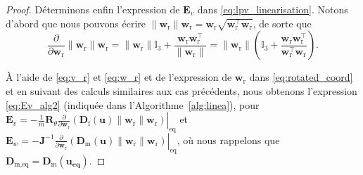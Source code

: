 \begin{proof}
Déterminons enfin l'expression de $\boldsymbol{E}_{v}$ dans \eqref{eq:lpv_linearisation}. Notons d'abord que nous pouvons écrire
$\|\boldsymbol{w}_\text{r}\| \boldsymbol{w}_\text{r} = 
 \boldsymbol{w}_\text{r} \sqrt{\boldsymbol{w}_\text{r}^\top \boldsymbol{w}_\text{r}  }$, de sorte que
$$
\frac{\partial }{\partial \boldsymbol{w}_\text{r}}
\|\boldsymbol{w}_\text{r}\| \boldsymbol{w}_\text{r} = 
\|\boldsymbol{w}_\text{r}\| \mathbb{I}_3
+ \frac{\boldsymbol{w}_\text{r} \boldsymbol{w}_\text{r}^\top}{\|\boldsymbol{w}_\text{r}\|} = 
\|\boldsymbol{w}_\text{r}\|
\left( \mathbb{I}_3 + \frac{\boldsymbol{w}_\text{r} \boldsymbol{w}_\text{r}^\top}{\boldsymbol{w}_\text{r}^\top \boldsymbol{w}_\text{r}} \right).
$$

À l'aide de \eqref{eq:v_r} et \eqref{eq:w_r} et de l'expression de $\boldsymbol{w}_\text{r}$ dans \eqref{eq:rotated_coord} et en suivant des calculs similaires aux cas précédents, nous obtenons l'expression
\eqref{eq:Ev_alg2} (indiquée dans l'Algorithme~\ref{alg:linea}), pour $\boldsymbol{E}_{v} = -  \frac{1}{m} \boldsymbol{R}_\theta \left. \frac{\partial}{\partial \boldsymbol{w}_\text{r}} \left(  \! \boldsymbol{D}_{\text{f}}(\boldsymbol{u}) \lVert \boldsymbol{w}_{\text{r}} \rVert \boldsymbol{w}_{\text{r}}  \right)\right|_{\mathrm{eq}} $ et  
 $\boldsymbol{E}_{w} = - \boldsymbol{J}^{-1} \left.
 \frac{\partial}{\partial \boldsymbol{w}_\text{r}} \left(  \boldsymbol{D}_{\text{m}}(\boldsymbol{u}) \lVert \boldsymbol{w}_{\text{r}} \rVert \boldsymbol{w}_{\text{r}}\right)\right|_{\mathrm{eq}}$, où nous rappelons que $\boldsymbol{D}_{\text{m,eq}} = \boldsymbol{D}_{\text{m}}(\boldsymbol{u_{\text{eq}}})$.
\end{proof}

